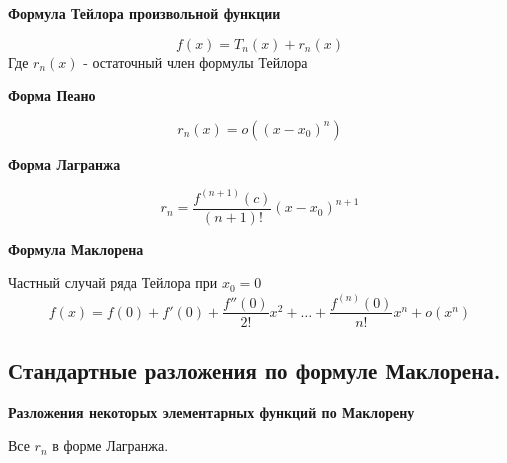 \documentclass[a4paper,12pt]{article}
\theoremstyle{plain} %
\theoremstyle{definition} %
\theoremstyle{remark} %
\begin{document}
\begin{center}
	\textbf{Формула Тейлора произвольной функции}
\end{center}

\[ f(x) = T_n(x) + r_n(x) \]
Где $r_n(x)$ - остаточный член формулы Тейлора

\begin{center}
	\textbf{Форма Пеано}
\end{center}

\[ r_n(x) = o((x-x_0)^n) \]

\begin{center}
	\textbf{Форма Лагранжа}
\end{center}

\[ r_n = \frac{f^{(n+1)}(c)}{(n+1)!}(x-x_0)^{n+1} \]

\begin{center}
	\textbf{Формула Маклорена}
\end{center}

Частный случай ряда Тейлора при $x_0 = 0$
\[ f(x) = f(0) + f'(0) + \frac{f''(0)}{2!}x^2 + \dots + \frac{f^{(n)}(0)}{n!}x^n + o(x^n) \]



\newpage

\subsection*{Стандартные разложения по формуле Маклорена.                                              }

\begin{center}
	\textbf{Разложения некоторых элементарных функций по Маклорену}
\end{center}

Все $r_n$ в форме Лагранжа.
\end{document}
